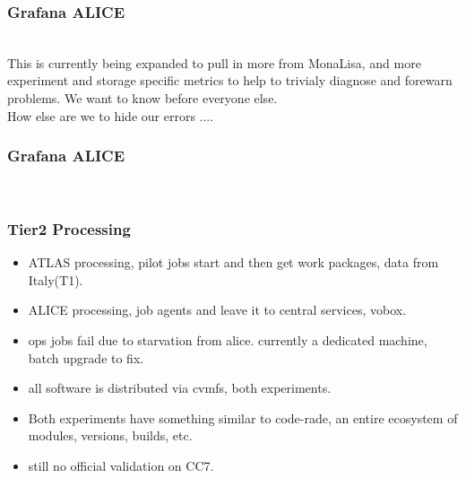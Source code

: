 \documentclass{beamer}
\begin{document}
\begin{frame}
  \frametitle{Grafana ALICE}
  \\
  This is currently being expanded to pull in more from MonaLisa, and more experiment and storage specific
  metrics to help to trivialy diagnose and forewarn problems. We want to know before everyone else.\\
    How else are we to hide our errors ....
\end{frame}

\begin{frame}
  \frametitle{Grafana ALICE}
  \\
\end{frame}

\begin{frame}
  \frametitle{Tier2 Processing}
  \begin{itemize}
      \item ATLAS processing, pilot jobs start and then get work packages, data from Italy(T1).
    \item ALICE processing, job agents and leave it to central services, vobox.
    \item ops jobs fail due to starvation from alice. currently a dedicated machine, batch upgrade to fix.
    \item all software is distributed via cvmfs, both experiments.
    \item Both experiments have something similar to code-rade, an entire ecosystem of modules, versions, builds, etc.
    \item still no official validation on CC7.
  \end{itemize}
\end{frame}
\end{document}
